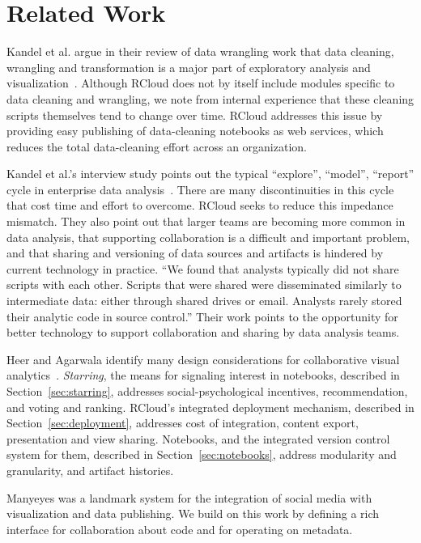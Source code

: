 \section{Related Work}

Kandel et al. argue in their review of data wrangling work that data
cleaning, wrangling and transformation is a major part of exploratory
analysis and visualization~\cite{Kandel:2011:RDI}. Although RCloud
does not by itself include modules specific to data cleaning and
wrangling, we note from internal experience that these cleaning
scripts themselves tend to change over time. RCloud addresses this
issue by providing easy publishing of data-cleaning notebooks as web
services, which reduces the total data-cleaning effort across an
organization.

Kandel et al.'s interview study points out the typical ``explore'',
``model'', ``report'' cycle in enterprise data
analysis~\cite{Kandel:2012:EDA}. There are many discontinuities in
this cycle that cost time and effort to overcome. RCloud seeks to
reduce this impedance mismatch. They also point out that larger teams
are becoming more common in data analysis, that supporting
collaboration is a difficult and important problem, and that sharing
and versioning of data sources and artifacts is hindered by current
technology in practice. ``We found that analysts typically did not
share scripts with each other. Scripts that were shared were
disseminated similarly to intermediate data: either through shared
drives or email. Analysts rarely stored their analytic code in source
control.'' Their work points to the opportunity for better technology
to support collaboration and sharing by data analysis teams.

Heer and Agarwala identify many design considerations for
collaborative visual analytics~\cite{Heer:2008:DCF}. \emph{Starring},
the means for signaling interest in notebooks, described in
Section~\ref{sec:starring}, addresses social-psychological incentives,
recommendation, and voting and ranking. RCloud's integrated deployment
mechanism, described in Section~\ref{sec:deployment}, addresses cost of
integration, content export, presentation and view sharing. Notebooks,
and the integrated version control system for them, described in
Section~\ref{sec:notebooks}, address modularity and granularity, and
artifact histories.

Manyeyes \cite{Viegas:2007:MAS} was a landmark system for the integration
of social media with visualization and data publishing. We build on this
work by defining a rich interface for collaboration about code and for
operating on metadata.

